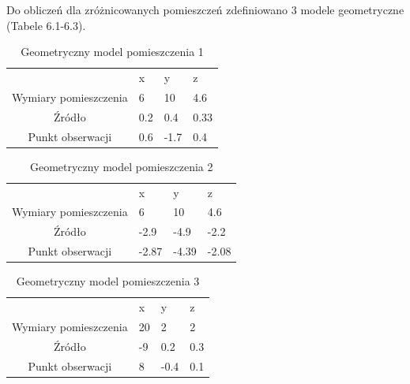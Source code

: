 Do obliczeń dla zróżnicowanych pomieszczeń zdefiniowano 3 modele geometryczne (Tabele 6.1-6.3).

\begin{table}[H]
        \centering
        \begin{threeparttable}
                \caption{Geometryczny model pomieszczenia 1}\label{tab:table_example}
                \begin{tabularx}{0.6\textwidth}{| c | X | X | X |}
                        \midrule
                        		&	x & y & z \\
		Wymiary pomieszczenia & 6 & 10 & 4.6 \\
                        Źródło & 0.2 & 0.4 & 0.33 \\
		Punkt obserwacji & 0.6 & -1.7 & 0.4 \\
                        \bottomrule
                \end{tabularx}
        \end{threeparttable}
\end{table}

\begin{table}[H]
        \centering
        \begin{threeparttable}
                \caption{Geometryczny model pomieszczenia 2}\label{tab:table_example}
                \begin{tabularx}{0.6\textwidth}{| c | X | X | X |}
                        \midrule
                        		&	x & y & z \\
		Wymiary pomieszczenia & 6 & 10 & 4.6 \\
                        Źródło & -2.9 & -4.9 & -2.2 \\
		Punkt obserwacji & -2.87 & -4.39 & -2.08 \\
                        \bottomrule
                \end{tabularx}
        \end{threeparttable}
\end{table}

\begin{table}[H]
        \centering
        \begin{threeparttable}
                \caption{Geometryczny model pomieszczenia 3}\label{tab:table_example}
                \begin{tabularx}{0.6\textwidth}{| c | X | X | X |}
                        \midrule
                        		&	x & y & z \\
		Wymiary pomieszczenia & 20 & 2 & 2 \\
                        Źródło & -9 & 0.2 & 0.3 \\
		Punkt obserwacji & 8 & -0.4 & 0.1 \\
                        \bottomrule
                \end{tabularx}
        \end{threeparttable}
\end{table}

